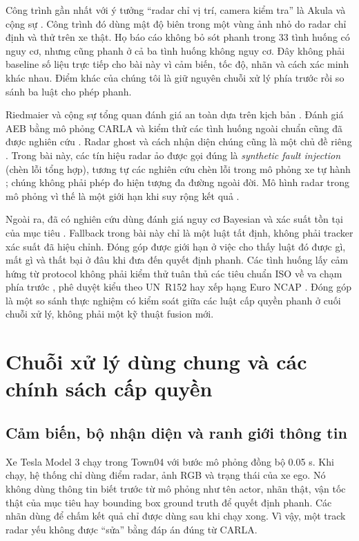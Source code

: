 \documentclass[conference]{IEEEtran}
\begin{document}
Công trình gần nhất với ý tưởng ``radar chỉ vị trí, camera kiểm tra'' là Akula
và cộng sự \cite{akula2026radarguided}. Công trình đó dùng mật độ biên trong
một vùng ảnh nhỏ do radar chỉ định và thử trên xe thật. Họ báo cáo không bỏ sót
phanh trong 33 tình huống có nguy cơ, nhưng cũng phanh ở cả ba tình huống không
nguy cơ. Đây không phải baseline số liệu trực tiếp cho bài này vì cảm biến,
tốc độ, nhãn và cách xác minh khác nhau. Điểm khác của chúng tôi là giữ nguyên
chuỗi xử lý phía trước rồi so sánh ba luật cho phép phanh.

Riedmaier và cộng sự tổng quan đánh giá an toàn dựa trên kịch bản
\cite{riedmaier2020survey}. Đánh giá AEB bằng mô phỏng CARLA và kiểm thử các
tình huống ngoài chuẩn cũng đã được nghiên cứu
\cite{gomez2022carla,feng2025dvs,rao2024corner}. Radar ghost
và cách nhận diện chúng cũng là một chủ đề riêng \cite{kraus2021ghost}. Trong
bài này, các tín hiệu radar ảo được gọi đúng là \emph{synthetic fault injection}
(chèn lỗi tổng hợp), tương tự các nghiên cứu chèn lỗi trong mô phỏng xe tự
hành \cite{jha2019mlfi}; chúng không phải phép đo hiện tượng đa đường ngoài đời.
Mô hình radar trong mô phỏng vì thế là một giới hạn khi suy rộng kết quả
\cite{magosi2022radar}.

Ngoài ra, đã có nghiên cứu dùng đánh giá nguy cơ Bayesian và xác suất tồn tại
của mục tiêu \cite{sandblom2011threat,lindenmaier2022existence}. Fallback trong
bài này chỉ là một luật tất định, không phải tracker xác suất đã hiệu chỉnh.
Đóng góp được giới hạn ở việc cho thấy luật đó được gì, mất gì và thất bại ở
đâu khi đưa đến quyết định phanh. Các tình huống lấy cảm hứng từ protocol không
phải kiểm thử tuân thủ các tiêu chuẩn ISO về va chạm phía trước
\cite{iso15623,iso22839}, phê duyệt kiểu theo UN~R152 \cite{unr152} hay xếp
hạng Euro NCAP \cite{euroncap_aeb}. Đóng góp là một so sánh thực nghiệm có
kiểm soát giữa các luật cấp quyền phanh ở cuối chuỗi xử lý, không phải một kỹ
thuật fusion mới.

\section{Chuỗi xử lý dùng chung và các chính sách cấp quyền}
\subsection{Cảm biến, bộ nhận diện và ranh giới thông tin}
Xe Tesla Model 3 chạy trong Town04 với bước mô phỏng đồng bộ 0.05 s. Khi chạy,
hệ thống chỉ dùng điểm radar, ảnh RGB và trạng thái của xe ego. Nó không dùng
thông tin biết trước từ mô phỏng như tên actor, nhãn thật, vận tốc thật của mục
tiêu hay bounding box ground truth để quyết định phanh. Các nhãn dùng để chấm
kết quả chỉ được dùng sau khi chạy xong. Vì vậy, một track radar yếu không được
``sửa'' bằng đáp án đúng từ CARLA.
\end{document}
